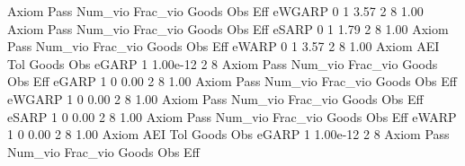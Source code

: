{\smallskip}
{\smallskip}
{\smallskip}
       Axiom {\VBAR} Pass     Num_vio    Frac_vio       Goods         Obs         Eff  
      eWGARP {\VBAR}    0           1        3.57           2           8        1.00  
{\smallskip}
{\smallskip}
{\smallskip}
       Axiom {\VBAR} Pass     Num_vio    Frac_vio       Goods         Obs         Eff  
       eSARP {\VBAR}    0           1        1.79           2           8        1.00  
{\smallskip}
{\smallskip}
{\smallskip}
       Axiom {\VBAR} Pass     Num_vio    Frac_vio       Goods         Obs         Eff  
       eWARP {\VBAR}    0           1        3.57           2           8        1.00  
{\smallskip}
       Axiom {\VBAR}       AEI        Tol      Goods        Obs 
       eGARP {\VBAR}         1   1.00e-12          2          8 
{\smallskip}
{\smallskip}
{\smallskip}
       Axiom {\VBAR} Pass     Num_vio    Frac_vio       Goods         Obs         Eff  
       eGARP {\VBAR}    1           0        0.00           2           8        1.00  
{\smallskip}
{\smallskip}
{\smallskip}
       Axiom {\VBAR} Pass     Num_vio    Frac_vio       Goods         Obs         Eff  
      eWGARP {\VBAR}    1           0        0.00           2           8        1.00  
{\smallskip}
{\smallskip}
{\smallskip}
       Axiom {\VBAR} Pass     Num_vio    Frac_vio       Goods         Obs         Eff  
       eSARP {\VBAR}    1           0        0.00           2           8        1.00  
{\smallskip}
{\smallskip}
{\smallskip}
       Axiom {\VBAR} Pass     Num_vio    Frac_vio       Goods         Obs         Eff  
       eWARP {\VBAR}    1           0        0.00           2           8        1.00  
{\smallskip}
       Axiom {\VBAR}       AEI        Tol      Goods        Obs 
       eGARP {\VBAR}         1   1.00e-12          2          8 
{\smallskip}
{\smallskip}
{\smallskip}
       Axiom {\VBAR} Pass     Num_vio    Frac_vio       Goods         Obs         Eff  
